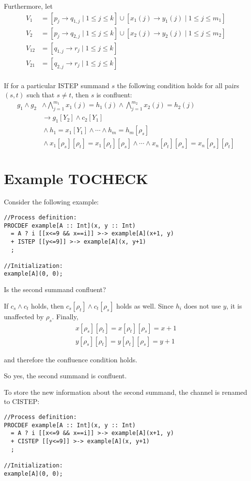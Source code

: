 Furthermore, let
\begin{align*}
V_{1} &= [p_j \rightarrow q_{1,j} \;|\; 1 \leq j \leq k] \cup [x_1(j) \rightarrow y_1(j) \;|\; 1 \leq j \leq m_1] \\
V_{2} &= [p_j \rightarrow q_{2,j} \;|\; 1 \leq j \leq k] \cup [x_2(j) \rightarrow y_2(j) \;|\; 1 \leq j \leq m_2] \\
V_{12} &= [q_{1,j} \rightarrow r_j \;|\; 1 \leq j \leq k] \\
V_{21} &= [q_{2,j} \rightarrow r_j \;|\; 1 \leq j \leq k] \\
\end{align*}

If for a particular ISTEP summand $s$ the following condition holds for all pairs $(s, t)$ such that $s \neq t$, then $s$ is confluent:
\begin{align*}
g_1 \land g_2 &\land \bigwedge\limits_{j=1}^{m_1} x_1(j) = h_1(j) \land \bigwedge\limits_{j=1}^{m_2} x_2(j) = h_2(j) \\
&\rightarrow{} g_1[Y_2] \land c_2[Y_1] \\
&{} \land h_1 = x_1[Y_1] \land \cdots{} \land h_m = h_m[\rho_s] \\
&{} \land x_1[\rho_s][\rho_t] = x_1[\rho_t][\rho_s] \land \cdots{} \land x_n[\rho_t][\rho_s] = x_n[\rho_s][\rho_t]
\end{align*}

\section{Example TOCHECK}

Consider the following example:

\begin{lstlisting}
//Process definition:
PROCDEF example[A :: Int](x, y :: Int)
  = A ? i [[x<=9 && x==i]] >-> example[A](x+1, y)
  + ISTEP [[y<=9]] >-> example[A](x, y+1)
  ;

//Initialization:
example[A](0, 0);
\end{lstlisting}

Is the second summand confluent?

If $c_s \land c_t$ holds, then $c_s[\rho_t] \land c_t[\rho_s]$ holds as well.
Since $h_i$ does not use $y$, it is unaffected by $\rho_s$.
Finally,
\begin{align*}
x[\rho_s][\rho_t] = x[\rho_t][\rho_s] = x+1 \\
y[\rho_s][\rho_t] = y[\rho_t][\rho_s] = y+1
\end{align*}

and therefore the confluence condition holds.

So yes, the second summand is confluent.

To store the new information about the second summand, the channel is renamed to CISTEP:

\begin{lstlisting}
//Process definition:
PROCDEF example[A :: Int](x, y :: Int)
  = A ? i [[x<=9 && x==i]] >-> example[A](x+1, y)
  + CISTEP [[y<=9]] >-> example[A](x, y+1)
  ;

//Initialization:
example[A](0, 0);
\end{lstlisting}

